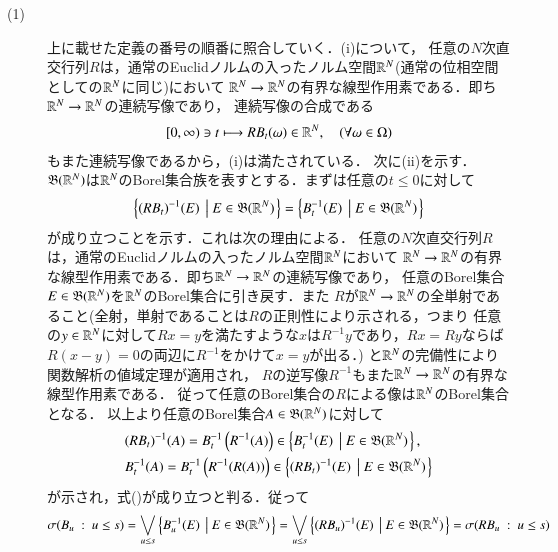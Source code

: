 \begin{prf}
\begin{description}\mbox{}
	\item[(1)] 
		上に載せた定義の番号の順番に照合していく．(i)について，
		任意の$N$次直交行列$R$は，通常のEuclidノルムの入ったノルム空間$\mathbb{R}^N$(通常の位相空間としての$\mathbb{R}^N$に同じ)において
		$\mathbb{R}^N \rightarrow \mathbb{R}^N$の有界な線型作用素である．即ち$\mathbb{R}^N \rightarrow \mathbb{R}^N$の連続写像であり，
		連続写像の合成である
		\begin{align}
			[0,\infty) \ni t \longmapsto RB_t(\omega) \in \mathbb{R}^N, \quad(\forall \omega \in \Omega)
		\end{align}
		もまた連続写像であるから，(i)は満たされている．
		次に(ii)を示す．$\mathfrak{B}(\mathbb{R}^N)$は$\mathbb{R}^N$のBorel集合族を表すとする．まずは任意の$t \leq 0$に対して
		\begin{align}
			\left\{(RB_t)^{-1}(E)\ \left|\ E \in \mathfrak{B}(\mathbb{R}^N) \right.\right\} 
			= \left\{B_t^{-1}(E)\ \left|\ E \in \mathfrak{B}(\mathbb{R}^N) \right.\right\} \label{eq:stoc_proc_Q1_1}
		\end{align}
		が成り立つことを示す．これは次の理由による．
		任意の$N$次直交行列$R$は，通常のEuclidノルムの入ったノルム空間$\mathbb{R}^N$において
		$\mathbb{R}^N \rightarrow \mathbb{R}^N$の有界な線型作用素である．即ち$\mathbb{R}^N \rightarrow \mathbb{R}^N$の連続写像であり，
		任意のBorel集合$E \in \mathfrak{B}(\mathbb{R}^N)$を$\mathbb{R}^N$のBorel集合に引き戻す．また
		$R$が$\mathbb{R}^N \rightarrow \mathbb{R}^N$の全単射であること(全射，単射であることは$R$の正則性により示される，つまり
		任意の$y \in \mathbb{R}^N$に対して$Rx = y$を満たすような$x$は$R^{-1}y$であり，$Rx=Ry$ならば$R(x-y)=0$の両辺に$R^{-1}$をかけて$x=y$が出る．)
		と$\mathbb{R}^N$の完備性により関数解析の値域定理が適用され，
		$R$の逆写像$R^{-1}$もまた$\mathbb{R}^N \rightarrow \mathbb{R}^N$の有界な線型作用素である．
		従って任意のBorel集合の$R$による像は$\mathbb{R}^N$のBorel集合となる．
		以上より任意のBorel集合$A \in \mathfrak{B}(\mathbb{R}^N)$に対して
		\begin{align}
			&(RB_t)^{-1}(A) = B_t^{-1}\left(R^{-1}(A)\right) \in \left\{B_t^{-1}(E)\ \left|\ E \in \mathfrak{B}(\mathbb{R}^N) \right.\right\}, \\
			&B_t^{-1}(A) = B_t^{-1}\left(R^{-1}(R(A))\right) \in \left\{(RB_t)^{-1}(E)\ \left|\ E \in \mathfrak{B}(\mathbb{R}^N) \right.\right\}
		\end{align}
		が示され，式()が成り立つと判る．従って
		\begin{align}
			\sigma(B_u\ :\ u \leq s) = \bigvee_{u \leq s} \left\{B_u^{-1}(E)\ \left|\ E \in \borel{\R^N} \right.\right\}
			= \bigvee_{u \leq s} \left\{(RB_u)^{-1}(E)\ \left|\ E \in \borel{\R^N} \right.\right\} 
			= \sigma(RB_u\ :\ u \leq s)

\end{align}
\end{description}
\end{prf}
